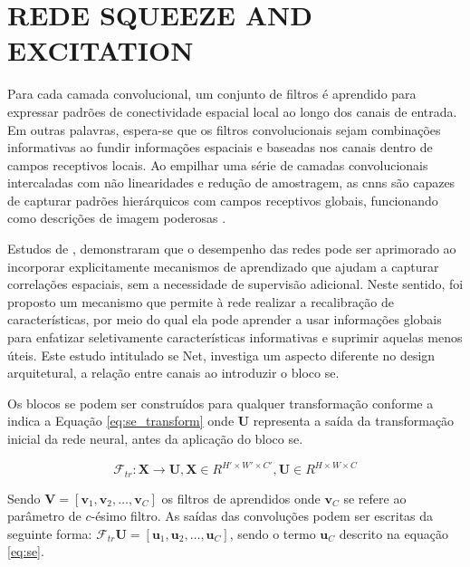 \section{REDE SQUEEZE AND EXCITATION}
\label{sec:se_net}

Para cada camada convolucional, um conjunto de filtros é aprendido para expressar padrões de conectividade espacial local ao longo dos canais de entrada. Em outras palavras, espera-se que os filtros convolucionais sejam combinações informativas ao fundir informações espaciais e baseadas nos canais dentro de campos receptivos locais.
Ao empilhar uma série de camadas convolucionais intercaladas com não linearidades e redução de amostragem, as \gls{cnn}s são capazes de capturar padrões hierárquicos com campos receptivos globais, funcionando como descrições de imagem poderosas \cite{huSqueezeandExcitationNetworks2018}. 

Estudos de , demonstraram que o desempenho das redes pode ser aprimorado ao incorporar explicitamente mecanismos de aprendizado que ajudam a capturar correlações espaciais, sem a necessidade de supervisão adicional. Neste sentido, foi proposto um mecanismo que permite à rede realizar a recalibração de características, por meio do qual ela pode aprender a usar informações globais para enfatizar seletivamente características informativas e suprimir aquelas menos úteis. Este estudo intitulado \gls{se} Net, investiga um aspecto diferente no design arquitetural, a relação entre canais ao introduzir o bloco \gls{se}.

Os blocos \gls{se} podem ser construídos para qualquer transformação conforme a indica a Equação \ref{eq:se_transform} onde $\mathbf{U}$ representa a saída da transformação inicial da rede neural, antes da aplicação do bloco \gls{se}.

\begin{equation}
\mathcal{F}_{tr} : \mathbf{X} \rightarrow \mathbf{U}, \mathbf{X} \in R^{H' \times W' \times C'}, \mathbf{U} \in R^{H \times W \times C}
\label{eq:se_transform}
\end{equation}

Sendo $\mathbf{V} = [\mathbf{v}_1, \mathbf{v}_2, \ldots, \mathbf{v}_C]$ os filtros de aprendidos onde $\mathbf{v}_C$ se refere ao parâmetro de $c$-ésimo filtro. As saídas das convoluções podem ser escritas da seguinte forma: $\mathcal{F}_{tr} \mathbf{U} = [\mathbf{u}_1, \mathbf{u}_2, \ldots, \mathbf{u}_C]$, sendo o termo $\mathbf{u}_C$ descrito na equação \ref{eq:se}. 

